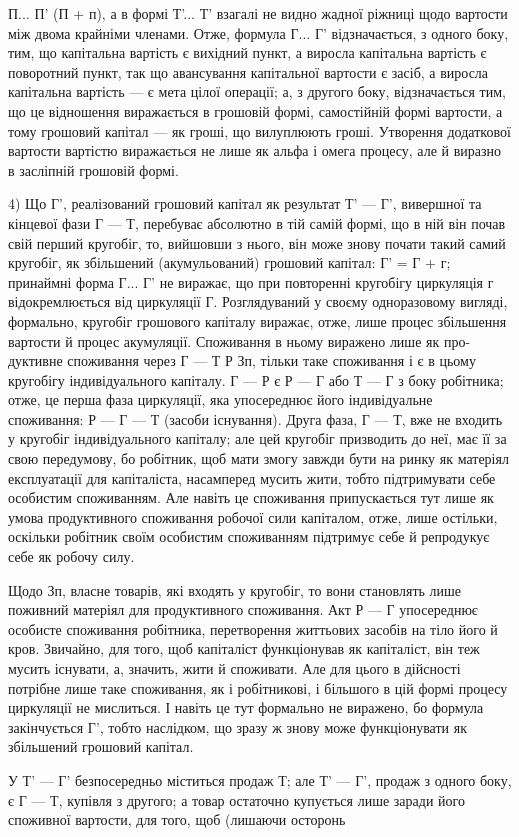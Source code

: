 П... П' (П + п), а в формі Т'... Т' взагалі не видно жадної ріжниці щодо
вартости між двома крайніми членами. Отже, формула Г... Г’ відзначається,
з одного боку, тим, що капітальна вартість є вихідний пункт, а виросла
капітальна вартість є поворотний пункт, так що авансування
капітальної вартости є засіб, а виросла капітальна вартість — є мета
цілої операції; а, з другого боку, відзначається тим, що це відношення
виражається в грошовій формі, самостійній формі вартости, а тому грошовий
капітал — як гроші, що вилуплюють гроші. Утворення додаткової
вартости вартістю виражається не лише як альфа і омега процесу,
але й виразно в засліпній грошовій формі.

4) Що Г', реалізований грошовий капітал як результат Т' — Г', вивершної
та кінцевої фази Г — Т, перебуває абсолютно в тій самій формі, що в
ній він почав свій перший кругобіг, то, вийшовши з нього, він може
знову почати такий самий кругобіг, як збільшений (акумульований)
грошовий капітал: Г' = Г + г; принаймні форма Г... Г' не виражає, що
при повторенні кругобігу циркуляція г відокремлюється від циркуляції Г.
Розглядуваний у своєму одноразовому вигляді, формально, кругобіг
грошового капіталу виражає, отже, лише процес збільшення вартости й
процес акумуляції. Споживання в ньому виражено лише як про-дуктивне споживання через Г — Т  Р Зп,
тільки таке споживання
і є в цьому кругобігу індивідуального капіталу. Г — Р є Р — Г або Т — Г
з боку робітника; отже, це перша фаза циркуляції, яка упосереднює його
індивідуальне споживання: Р — Г — Т (засоби існування). Друга фаза, Г — Т,
вже не входить у кругобіг індивідуального капіталу; але цей кругобіг
призводить до неї, має її за свою передумову, бо робітник, щоб мати
змогу завжди бути на ринку як матеріял експлуатації для капіталіста,
насамперед мусить жити, тобто підтримувати себе особистим споживанням.
Але навіть це споживання припускається тут лише як умова продуктивного
споживання робочої сили капіталом, отже, лише остільки, оскільки
робітник своїм особистим споживанням підтримує себе й репродукує себе
як робочу силу.

Щодо Зп, власне товарів, які входять у кругобіг, то вони
становлять лише поживний матеріял для продуктивного споживання. Акт
Р — Г упосереднює особисте споживання робітника, перетворення життьових
засобів на тіло його й кров. Звичайно, для того, щоб капіталіст
функціонував як капіталіст, він теж мусить існувати, а, значить, жити й
споживати. Але для цього в дійсності потрібне лише таке споживання, як і
робітникові, і більшого в цій формі процесу циркуляції не мислиться.
І навіть це тут формально не виражено, бо формула закінчується Г',
тобто наслідком, що зразу ж знову може функціонувати як збільшений
грошовий капітал.

У Т' — Г' безпосередньо міститься продаж Т; але Т' — Г', продаж з
одного боку, є Г — Т, купівля з другого; а товар остаточно купується
лише заради його споживної вартости, для того, щоб (лишаючи осторонь
